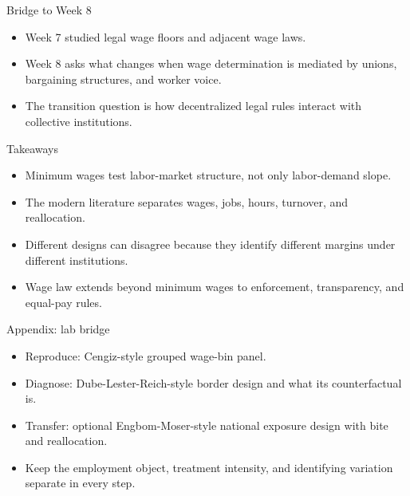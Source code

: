 \documentclass[aspectratio=169,11pt]{beamer}
\begin{document}
\begin{frame}{Bridge to Week 8}
\begin{itemize}
    \item Week 7 studied legal wage floors and adjacent wage laws.
    \item Week 8 asks what changes when wage determination is mediated by unions, bargaining structures, and worker voice.
    \item The transition question is how decentralized legal rules interact with collective institutions.
\end{itemize}
\end{frame}

\begin{frame}{Takeaways}
\begin{itemize}
    \item Minimum wages test labor-market structure, not only labor-demand slope.
    \item The modern literature separates wages, jobs, hours, turnover, and reallocation.
    \item Different designs can disagree because they identify different margins under different institutions.
    \item Wage law extends beyond minimum wages to enforcement, transparency, and equal-pay rules.
\end{itemize}
\end{frame}

\appendix

\begin{frame}{Appendix: lab bridge}
\begin{itemize}
    \item Reproduce: Cengiz-style grouped wage-bin panel.
    \item Diagnose: Dube-Lester-Reich-style border design and what its counterfactual is.
    \item Transfer: optional Engbom-Moser-style national exposure design with bite and reallocation.
    \item Keep the employment object, treatment intensity, and identifying variation separate in every step.
\end{itemize}
\end{frame}
\end{document}
